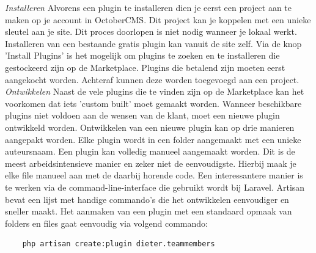 \noindent
\textit{Installeren}\newline
Alvorens een plugin te installeren dien je eerst een project aan te maken op je account in OctoberCMS. Dit project kan je koppelen met een unieke sleutel aan je site. Dit proces doorlopen is niet nodig wanneer je lokaal werkt.
\newline\newline
Installeren van een bestaande gratis plugin kan vanuit de site zelf. Via de knop 'Install Plugins' is het mogelijk om plugins te zoeken en te installeren die gestockeerd zijn op de Marketplace. Plugins die betalend zijn moeten eerst aangekocht worden. Achteraf kunnen deze worden toegevoegd aan een project. 
\newline\newline
\noindent\textit{Ontwikkelen}\newline
Naast de vele plugins die te vinden zijn op de Marketplace kan het voorkomen dat iets 'custom built' moet gemaakt worden. Wanneer beschikbare plugins niet voldoen aan de wensen van de klant, moet een nieuwe plugin ontwikkeld worden. 
\newline\newline
Ontwikkelen van een nieuwe plugin kan op drie manieren aangepakt worden. Elke plugin wordt in een folder aangemaakt met een unieke auteursnaam.
\newline\newline
Een plugin kan volledig manueel aangemaakt worden. Dit is de meest arbeidsintensieve manier en zeker niet de eenvoudigste. Hierbij maak je elke file manueel aan met de daarbij horende code. Een interessantere manier is te werken via de command-line-interface die gebruikt wordt bij Laravel. Artisan bevat een lijst met handige commando's die het ontwikkelen eenvoudiger en sneller maakt. Het aanmaken van een plugin met een standaard opmaak van folders en files gaat eenvoudig via volgend commando:

\begin{verbatim}
	php artisan create:plugin dieter.teammembers
\end{verbatim}


